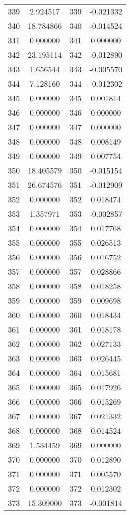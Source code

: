 \documentclass[12pt]{article}
\begin{document}
\begin{longtable}{@{}cccc@{}}
339 & 2.924517 & 339 & -0.021332 \\
340 & 18.784866 & 340 & -0.014524 \\
341 & 0.000000 & 341 & 0.000000 \\
342 & 23.195114 & 342 & -0.012890 \\
343 & 1.656544 & 343 & -0.005570 \\
344 & 7.128160 & 344 & -0.012302 \\
345 & 0.000000 & 345 & 0.001814 \\
346 & 0.000000 & 346 & 0.000000 \\
347 & 0.000000 & 347 & 0.000000 \\
348 & 0.000000 & 348 & 0.008149 \\
349 & 0.000000 & 349 & 0.007754 \\
350 & 18.405579 & 350 & -0.015154 \\
351 & 26.674576 & 351 & -0.012909 \\
352 & 0.000000 & 352 & 0.018474 \\
353 & 1.357971 & 353 & -0.002857 \\
354 & 0.000000 & 354 & 0.017768 \\
355 & 0.000000 & 355 & 0.026513 \\
356 & 0.000000 & 356 & 0.016752 \\
357 & 0.000000 & 357 & 0.028866 \\
358 & 0.000000 & 358 & 0.018258 \\
359 & 0.000000 & 359 & 0.009698 \\
360 & 0.000000 & 360 & 0.018434 \\
361 & 0.000000 & 361 & 0.018178 \\
362 & 0.000000 & 362 & 0.027133 \\
363 & 0.000000 & 363 & 0.026445 \\
364 & 0.000000 & 364 & 0.015681 \\
365 & 0.000000 & 365 & 0.017926 \\
366 & 0.000000 & 366 & 0.015269 \\
367 & 0.000000 & 367 & 0.021332 \\
368 & 0.000000 & 368 & 0.014524 \\
369 & 1.534459 & 369 & 0.000000 \\
370 & 0.000000 & 370 & 0.012890 \\
371 & 0.000000 & 371 & 0.005570 \\
372 & 0.000000 & 372 & 0.012302 \\
373 & 15.309000 & 373 & -0.001814 \\

\end{longtable}
\end{document}
